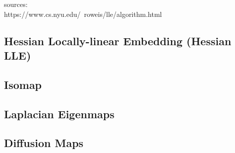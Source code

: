 \documentclass{gtpart}
\theoremstyle{definition}
\begin{document}
sources:\\
https://www.cs.nyu.edu/~roweis/lle/algorithm.html

\subsection{Hessian Locally-linear Embedding (Hessian LLE)}

\subsection{Isomap}

\subsection{Laplacian Eigenmaps}

\subsection{Diffusion Maps}
\end{document}
